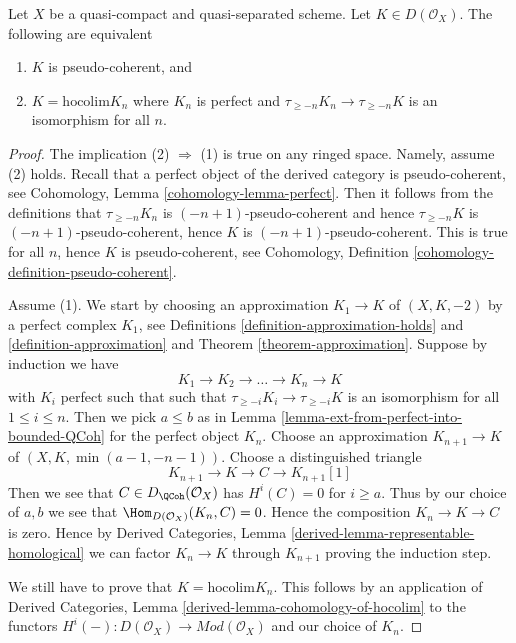 \begin{lemma}
\label{lemma-pseudo-coherent-hocolim}
Let $X$ be a quasi-compact and quasi-separated scheme.
Let $K \in D(\mathcal{O}_X)$. The following are equivalent
\begin{enumerate}
\item $K$ is pseudo-coherent, and
\item $K = \text{hocolim} K_n$ where
$K_n$ is perfect and $\tau_{\geq -n}K_n \to \tau_{\geq -n}K$
is an isomorphism for all $n$.
\end{enumerate}
\end{lemma}

\begin{proof}
The implication (2) $\Rightarrow$ (1) is true on any ringed space.
Namely, assume (2) holds. Recall that a perfect object of the derived
category is pseudo-coherent, see
Cohomology, Lemma \ref{cohomology-lemma-perfect}.
Then it follows from the definitions that
$\tau_{\geq -n}K_n$ is $(-n + 1)$-pseudo-coherent
and hence $\tau_{\geq -n}K$ is $(-n + 1)$-pseudo-coherent,
hence $K$ is $(-n + 1)$-pseudo-coherent. This is true for
all $n$, hence $K$ is pseudo-coherent, see
Cohomology, Definition \ref{cohomology-definition-pseudo-coherent}.

\medskip\noindent
Assume (1). We start by choosing an approximation
$K_1 \to K$ of $(X, K, -2)$ by a perfect complex $K_1$, see
Definitions \ref{definition-approximation-holds} and
\ref{definition-approximation} and
Theorem \ref{theorem-approximation}.
Suppose by induction we have
$$
K_1 \to K_2 \to \ldots \to K_n \to K
$$
with $K_i$ perfect such that
such that $\tau_{\geq -i}K_i \to \tau_{\geq -i}K$ is an isomorphism
for all $1 \leq i \leq n$. Then we pick $a \leq b$ as in
Lemma \ref{lemma-ext-from-perfect-into-bounded-QCoh}
for the perfect object $K_n$. Choose an approximation
$K_{n + 1} \to K$ of $(X, K, \min(a - 1, -n - 1))$.
Choose a distinguished triangle
$$
K_{n + 1} \to K \to C \to K_{n + 1}[1]
$$
Then we see that $C \in D_\QCoh(\mathcal{O}_X)$ has
$H^i(C) = 0$ for $i \geq a$. Thus by our choice of $a, b$
we see that $\Hom_{D(\mathcal{O}_X)}(K_n, C) = 0$.
Hence the composition $K_n \to K \to C$ is zero. Hence by
Derived Categories, Lemma \ref{derived-lemma-representable-homological}
we can factor $K_n \to K$ through $K_{n + 1}$
proving the induction step.

\medskip\noindent
We still have to prove that $K = \text{hocolim} K_n$.
This follows by an application of
Derived Categories, Lemma \ref{derived-lemma-cohomology-of-hocolim}
to the functors
$H^i( - ) : D(\mathcal{O}_X) \to \textit{Mod}(\mathcal{O}_X)$
and our choice of $K_n$.
\end{proof}
